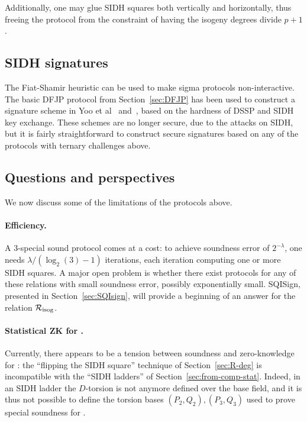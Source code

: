 Additionally, one may glue SIDH squares both vertically and
horizontally, thus freeing the protocol from the constraint of having
the isogeny degrees divide $p+1$.


\subsection{SIDH signatures}

The Fiat-Shamir heuristic can be used to make sigma protocols non-interactive.
The basic DFJP protocol from Section~\ref{sec:DFJP} has been used to construct a signature scheme in Yoo et al~\cite{YAJJS17} and~\cite{GPS20}, based on the hardness of DSSP and SIDH key exchange.
These schemes are no longer secure, due to the attacks on SIDH, but it is fairly straightforward to construct secure signatures based on any of the protocols with ternary challenges above.



%
%


\subsection{Questions and perspectives}

We now discuss some of the limitations of the protocols above.

\paragraph{Efficiency.}
A 3-special sound protocol comes at a cost: to achieve soundness error of $2^{-\lambda}$, one needs $\lambda/(\log_2(3)-1)$ iterations, each iteration computing one or more SIDH squares.
A major open problem is whether there exist protocols for any of these relations with small soundness error, possibly exponentially small.
SQISign, presented in Section~\ref{sec:SQIsign}, will provide a beginning of an answer for the relation $\R[isog]$.

\paragraph{Statistical ZK for \R[deg].}
Currently, there appears to be a tension between soundness and
zero-knowledge for \R[deg]: the ``flipping the SIDH square'' technique
of Section~\ref{sec:R-deg} is incompatible with the ``SIDH ladders''
of Section~\ref{sec:from-comp-stat}.  Indeed, in an SIDH ladder the
$D$-torsion is not anymore defined over the base field, and it is thus
not possible to define the torsion bases $(P_2,Q_2),(P_3,Q_3)$ used to
prove special soundness for \R[deg].

